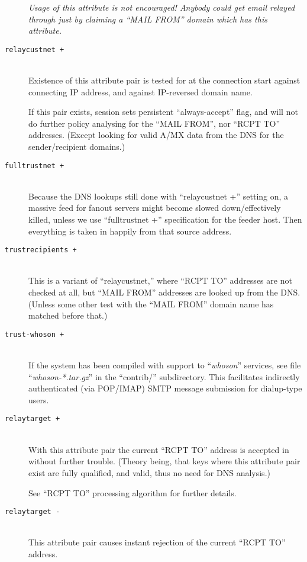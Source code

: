 \begin{description}
{\em Usage of this attribute is not encouraged!
Anybody could get email relayed through just by claiming
a ``MAIL FROM'' domain which has this attribute.}

\item[\tt relaycustnet +] \mbox{} \\
Existence of this attribute pair is tested for at the  connection
start against connecting IP address, and against IP-reversed domain name.

If this pair exists, session sets persistent ``always-accept'' flag,
and will not do further policy analysing for the ``MAIL FROM'', nor
``RCPT TO'' addresses.  (Except looking for valid A/MX data from the
DNS for the sender/recipient domains.)

\item[\tt fulltrustnet +] \mbox{} \\
Because the DNS lookups still done with ``relaycustnet +'' setting on,
a massive feed for fanout servers might become slowed down/effectively
killed, unless we use ``fulltrustnet +'' specification for the feeder
host.  Then everything is taken in happily from that source address.

\item[\tt trustrecipients +] \mbox{} \\
This is a variant of ``relaycustnet,'' where  ``RCPT TO'' addresses are
not checked at all, but ``MAIL FROM'' addresses are looked up from
the DNS. (Unless some other test with the ``MAIL FROM'' domain name
has matched before that.)

\item[\tt trust-whoson +] \mbox{} \\
If the system has been compiled with support to ``{\em whoson}'' services,
see file ``{\em whoson-*.tar.gz}'' in the ``contrib/'' subdirectory.
This facilitates indirectly authenticated (via POP/IMAP) SMTP message
submission for dialup-type users.

\item[\tt relaytarget +] \mbox{} \\
With this attribute pair the current ``RCPT TO'' address is accepted in
without further trouble. (Theory being, that keys where this attribute
pair exist are fully qualified, and valid, thus no need for DNS analysis.)

See ``RCPT TO'' processing algorithm for further details.

\item[\tt relaytarget -] \mbox{} \\
This attribute pair causes instant rejection of the current ``RCPT TO''
address.


\end{description}
